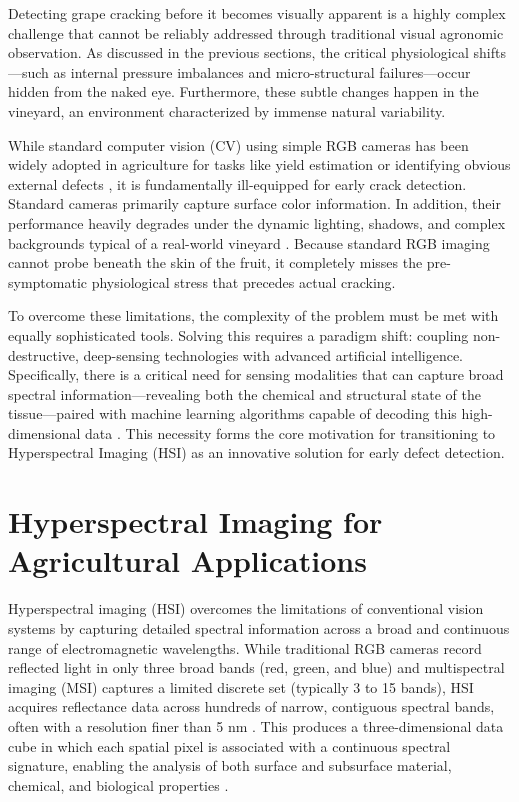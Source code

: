 \medskip
\noindent
Detecting grape cracking before it becomes visually apparent is a highly complex challenge that cannot be reliably addressed through traditional visual agronomic observation. As discussed in the previous sections, the critical physiological shifts---such as internal pressure imbalances and micro-structural failures---occur hidden from the naked eye. Furthermore, these subtle changes happen in the vineyard, an environment characterized by immense natural variability.

\medskip
\noindent
While standard computer vision (CV) using simple RGB cameras has been widely adopted in agriculture for tasks like yield estimation or identifying obvious external defects \parencite{tian2020computer, patricio2018computer}, it is fundamentally ill-equipped for early crack detection. Standard cameras primarily capture surface color information. In addition, their performance heavily degrades under the dynamic lighting, shadows, and complex backgrounds typical of a real-world vineyard \parencite{benos2021machine, DHANYA2022211}. Because standard RGB imaging cannot probe beneath the skin of the fruit, it completely misses the pre-symptomatic physiological stress that precedes actual cracking.

\medskip
\noindent
To overcome these limitations, the complexity of the problem must be met with equally sophisticated tools. Solving this requires a paradigm shift: coupling non-destructive, deep-sensing technologies with advanced artificial intelligence. Specifically, there is a critical need for sensing modalities that can capture broad spectral information---revealing both the chemical and structural state of the tissue---paired with machine learning algorithms capable of decoding this high-dimensional data \parencite{cao2025review}. This necessity forms the core motivation for transitioning to Hyperspectral Imaging (HSI) as an innovative solution for early defect detection.
\section{Hyperspectral Imaging for Agricultural Applications}
\label{sec:hyperspectral_imaging}

\noindent
Hyperspectral imaging (HSI) overcomes the limitations of conventional vision systems by capturing detailed spectral information across a broad and continuous range of electromagnetic wavelengths. While traditional RGB cameras record reflected light in only three broad bands (red, green, and blue) and multispectral imaging (MSI) captures a limited discrete set (typically 3 to 15 bands), HSI acquires reflectance data across hundreds of narrow, contiguous spectral bands, often with a resolution finer than 5 nm \parencite{Yuen2010, Shaw2003, Mehta2018}. This produces a three-dimensional data cube in which each spatial pixel is associated with a continuous spectral signature, enabling the analysis of both surface and subsurface material, chemical, and biological properties \parencite{hong2025hyperspectralimaging}.

